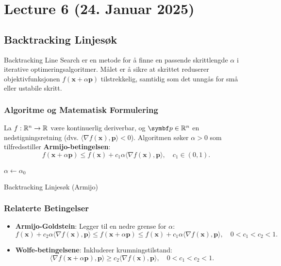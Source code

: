 \section{Lecture 6 (24. Januar 2025)}

\subsection*{Backtracking Linjesøk}
Backtracking Line Search er en metode for å finne en passende skrittlengde \( \alpha \) i iterative optimeringsalgoritmer. Målet er å sikre at skrittet reduserer objektivfunksjonen \( f(\bm{x} + \alpha \bm{p}) \) tilstrekkelig, samtidig som det unngås for små eller ustabile skritt.

\subsubsection*{Algoritme og Matematisk Formulering}
La \( f: \mathbb{R}^n \to \mathbb{R} \) være kontinuerlig deriverbar, og \( \bm{p} \in \R^n \) en nedstigningsretning (dvs. \( \langle \nabla f(\bm{x}), \bm{p} \rangle < 0 \)). Algoritmen søker \( \alpha > 0 \) som tilfredsstiller \textbf{Armijo-betingelsen}:
\[
  f(\bm{x} + \alpha \bm{p}) \leq f(\bm{x}) + c_1 \alpha \langle \nabla f(\bm{x}), \bm{p} \rangle, \quad c_1 \in (0, 1).
\]

\begin{algorithm}[H]
  \SetAlgoLined
  \DontPrintSemicolon
  \KwOut{ \(\alpha\)}
  \(\alpha \leftarrow \alpha_0\)\;
  \Return{ \(\alpha\)}
  \caption{Backtracking Linjesøk (Armijo)}
\end{algorithm}

\subsubsection*{Relaterte Betingelser}
\begin{itemize}
  \item \textbf{Armijo-Goldstein}: Legger til en nedre grense for \( \alpha \):
        \[
          f(\bm{x}) + c_2 \alpha \langle \nabla f(\bm{x}), \bm{p} \rangle \leq f(\bm{x} + \alpha \bm{p}) \leq f(\bm{x}) + c_1 \alpha \langle \nabla f(\bm{x}), \bm{p} \rangle, \quad 0 < c_1 < c_2 < 1.
        \]

  \item \textbf{Wolfe-betingelsene}: Inkluderer krumningstilstand:
        \[
          \langle \nabla f(\bm{x} + \alpha \bm{p}), \bm{p} \rangle \geq c_2 \langle \nabla f(\bm{x}), \bm{p} \rangle, \quad 0 < c_1 < c_2 < 1.
        \]
\end{itemize}

